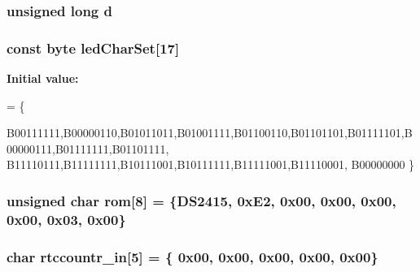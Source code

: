 \hypertarget{OWGeneric__DangerShield_8ino_a22871ee78191bcd7676a38358795104e}{
\subsubsection[{d}]{\setlength{\rightskip}{0pt plus 5cm}unsigned long d}}\label{OWGeneric__DangerShield_8ino_a22871ee78191bcd7676a38358795104e}
\hypertarget{OWGeneric__DangerShield_8ino_a9fd6363d57e3788ec90445fb8f7e46e6}{
\subsubsection[{led\-Char\-Set}]{\setlength{\rightskip}{0pt plus 5cm}const {\bf byte} led\-Char\-Set\mbox{[}17\mbox{]}}}\label{OWGeneric__DangerShield_8ino_a9fd6363d57e3788ec90445fb8f7e46e6}
{\bfseries Initial value\-:}
\begin{DoxyCode}
= \{

  B00111111,B00000110,B01011011,B01001111,B01100110,B01101101,B01111101,B00000111,B01111111,B01101111, 
  B11110111,B11111111,B10111001,B10111111,B11111001,B11110001,
  B00000000
\}
\end{DoxyCode}
\hypertarget{OWGeneric__DangerShield_8ino_a8beb78e2b3f2cb6e34f34861a875ca0b}{
\subsubsection[{rom}]{\setlength{\rightskip}{0pt plus 5cm}unsigned char rom\mbox{[}8\mbox{]} = \{D\-S2415, 0x\-E2, 0x00, 0x00, 0x00, 0x00, 0x03, 0x00\}}}\label{OWGeneric__DangerShield_8ino_a8beb78e2b3f2cb6e34f34861a875ca0b}
\hypertarget{OWGeneric__DangerShield_8ino_a81a94fdcf5fd0721c26e50dd4cd32b1e}{
\subsubsection[{rtccountr\-\_\-in}]{\setlength{\rightskip}{0pt plus 5cm}char rtccountr\-\_\-in\mbox{[}5\mbox{]} = \{ 0x00, 0x00, 0x00, 0x00, 0x00\}}}\label{OWGeneric__DangerShield_8ino_a81a94fdcf5fd0721c26e50dd4cd32b1e}
